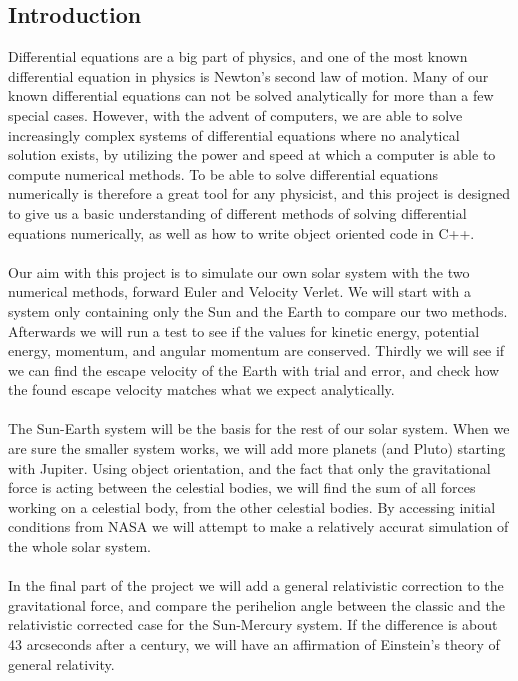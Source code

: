 \documentclass{article}
\begin{document}
\subsection{Introduction}
Differential equations are a big part of physics, and one of the most known differential equation in physics is Newton's second law of motion. Many of our known differential equations can not be solved analytically for more than a few special cases. However, with the advent of computers, we are able to solve increasingly complex systems of differential equations where no analytical solution exists, by utilizing the power and speed at which a computer is able to compute numerical methods. To be able to solve differential equations numerically is therefore a great tool for any physicist, and this project is designed to give us a basic understanding of different methods of solving differential equations numerically, as well as how to write object oriented code in C++. \\ \\
Our aim with this project is to simulate our own solar system with the two numerical methods, forward Euler and Velocity Verlet. We will start with a system only containing only the Sun and the Earth to compare our two methods. Afterwards we will run a test to see if the values for kinetic energy, potential energy, momentum, and angular momentum are conserved. Thirdly we will see if we can find the escape velocity of the Earth with trial and error, and check how the found escape velocity matches what we expect analytically. \\\\
The Sun-Earth system will be the basis for the rest of our solar system. When we are sure the smaller system works, we will add more planets (and Pluto) starting with Jupiter. Using object orientation, and the fact that only the gravitational force is acting between the celestial bodies, we will find the sum of all forces working on a celestial body, from the other celestial bodies. By accessing initial conditions from NASA \cite{nasa} we will attempt to make a relatively accurat simulation of the whole solar system. \\\\
In the final part of the project we will add a general relativistic correction to the gravitational force, and compare the perihelion angle between the classic and the relativistic corrected case for the Sun-Mercury system. %
If the difference is about 43 arcseconds after a century, we will have an affirmation of Einstein's theory of general relativity.
\end{document}

